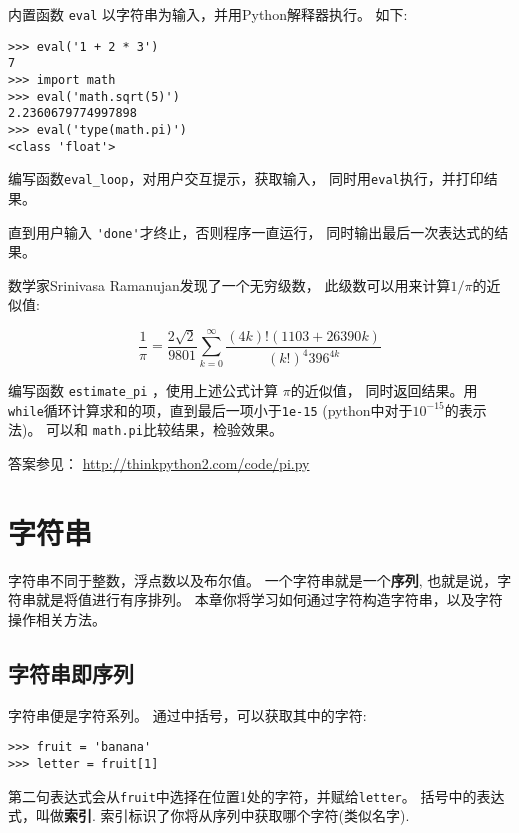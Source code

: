 \documentclass[10pt]{book}
\begin{document}
\begin{exercise}
内置函数 {\tt eval} 以字符串为输入，并用Python解释器执行。
如下:

\begin{verbatim}
>>> eval('1 + 2 * 3')
7
>>> import math
>>> eval('math.sqrt(5)')
2.2360679774997898
>>> eval('type(math.pi)')
<class 'float'>
\end{verbatim}
%
编写函数\verb"eval_loop"，对用户交互提示，获取输入，
同时用{\tt eval}执行，并打印结果。

直到用户输入 \verb"'done'"才终止，否则程序一直运行，
同时输出最后一次表达式的结果。

\end{exercise}


\begin{exercise}
数学家Srinivasa Ramanujan发现了一个无穷级数，
此级数可以用来计算$1 / \pi$的近似值:

\[ \frac{1}{\pi} = \frac{2\sqrt{2}}{9801} 
\sum^\infty_{k=0} \frac{(4k)!(1103+26390k)}{(k!)^4 396^{4k}} \]

编写函数 \verb"estimate_pi" ，使用上述公式计算 $\pi$的近似值，
同时返回结果。用{\tt while}循环计算求和的项，直到最后一项小于{\tt 1e-15}
(python中对于$10^{-15}$的表示法)。
可以和 {\tt math.pi}比较结果，检验效果。

答案参见： \url{http://thinkpython2.com/code/pi.py}

\end{exercise}


\chapter{字符串}
\label{strings}

字符串不同于整数，浮点数以及布尔值。
一个字符串就是一个{\bf 序列}, 也就是说，字符串就是将值进行有序排列。
本章你将学习如何通过字符构造字符串，以及字符操作相关方法。


\section{字符串即序列}

字符串便是字符系列。
通过中括号，可以获取其中的字符:

\begin{verbatim}
>>> fruit = 'banana'
>>> letter = fruit[1]
\end{verbatim}
%
第二句表达式会从{\tt fruit}中选择在位置1处的字符，并赋给{\tt letter}。
括号中的表达式，叫做{\bf 索引}.
索引标识了你将从序列中获取哪个字符(类似名字).
\end{document}
